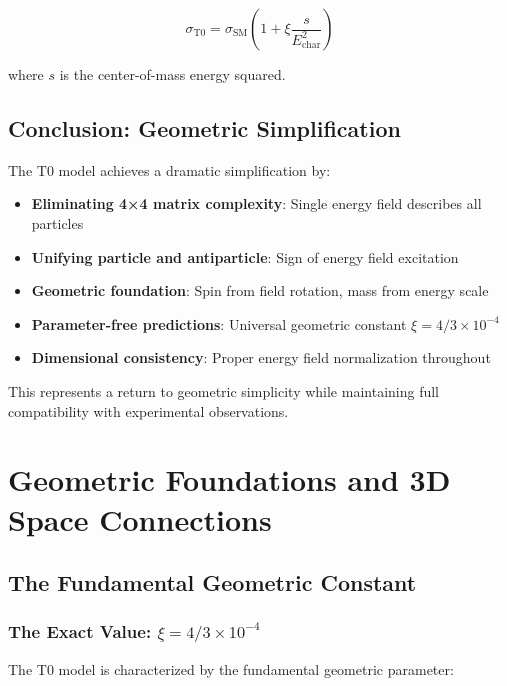 \documentclass[12pt,a4paper]{report}
\begin{document}
\begin{equation}
	\sigma_{\text{T0}} = \sigma_{\text{SM}} \left(1 + \xi \frac{s}{E_{\text{char}}^2}\right)
\end{equation}

where $s$ is the center-of-mass energy squared.

\section{Conclusion: Geometric Simplification}
\label{sec:conclusion}

The T0 model achieves a dramatic simplification by:

\begin{itemize}
	\item \textbf{Eliminating 4×4 matrix complexity}: Single energy field describes all particles
	\item \textbf{Unifying particle and antiparticle}: Sign of energy field excitation
	\item \textbf{Geometric foundation}: Spin from field rotation, mass from energy scale
	\item \textbf{Parameter-free predictions}: Universal geometric constant $\xi = 4/3 \times 10^{-4}$
	\item \textbf{Dimensional consistency}: Proper energy field normalization throughout
\end{itemize}

This represents a return to geometric simplicity while maintaining full compatibility with experimental observations.

\chapter{Geometric Foundations and 3D Space Connections}
\label{chap:geometric_foundations}

\section{The Fundamental Geometric Constant}
\label{sec:fundamental_geometric_constant}

\subsection{The Exact Value: $\xi = 4/3 \times 10^{-4}$}
\label{subsec:exact_value}

The T0 model is characterized by the fundamental geometric parameter:
\end{document}

